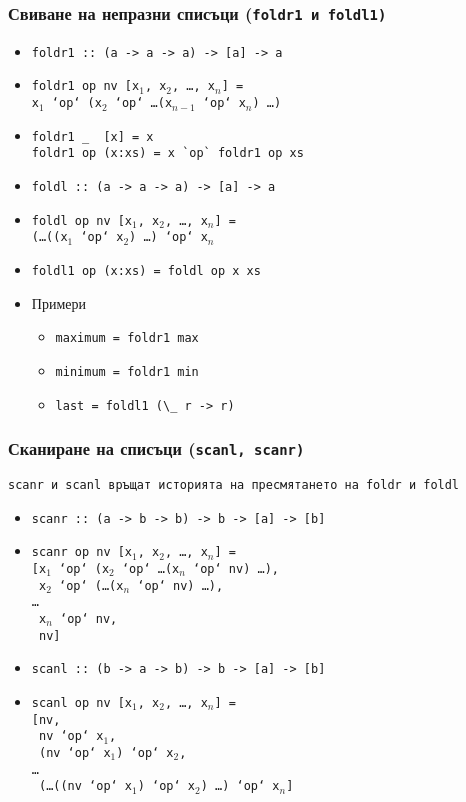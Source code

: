 \documentclass{beamer}
\begin{document}
\begin{frame}[fragile]
  \frametitle{Свиване на непразни списъци (\tt{foldr1} и \tt{foldl1})}
  \begin{itemize}[<+->]
  \item \tt{foldr1 :: (a -> a -> a) -> [a] -> a}
  \item \tt{foldr1 op nv [x$_1$, x$_2$, \ldots, x$_n$]} = \\
    \tt{x$_1$ `op` (x$_2$ `op` \ldots (x$_{n-1}$ `op` x$_n$) \ldots)}
  \item
\begin{verbatim}
foldr1 _  [x] = x
foldr1 op (x:xs) = x `op` foldr1 op xs
\end{verbatim}
  \item \tt{foldl :: (a -> a -> a) -> [a] -> a}
  \item \tt{foldl op nv [x$_1$, x$_2$, \ldots, x$_n$]} = \\
    \tt{(\ldots((x$_1$ `op` x$_2$) \ldots ) `op` x$_n$}
  \item \tt{foldl1 op (x:xs) = foldl op x xs}
  \item Примери
    \begin{itemize}
    \item \tt{maximum = foldr1 max}
    \item \tt{minimum = foldr1 min}
    \item \tt{last = foldl1 (\textbackslash \_ r -> r)}
    \end{itemize}
  \end{itemize}
\end{frame}

\begin{frame}
  \frametitle{Сканиране на списъци (\tt{scanl}, \tt{scanr})}
  \tt{scanr} и \tt{scanl} връщат историята на пресмятането на \tt{foldr} и \tt{foldl}
  \pause\small
  \begin{itemize}[<+->]
  \item \tt{scanr :: (a -> b -> b) -> b -> [a] -> \alert{[b]}}
  \item \tt{scanr op nv [x$_1$, x$_2$, \ldots, x$_n$]} = \\
    \tt{[x$_1$ `op` (x$_2$ `op` \ldots (x$_n$ `op` nv) \ldots),}\\
    \tt{ x$_2$ `op` (\ldots (x$_n$ `op` nv) \ldots),}\\
    \ldots\\
    \tt{ x$_n$ `op` nv,}\\
    \tt{ nv]}
  \item \tt{scanl :: (b -> a -> b) -> b -> [a] -> \alert{[b]}}
  \item \tt{scanl op nv [x$_1$, x$_2$, \ldots, x$_n$]} = \\
    \tt{[nv,}\\
    \tt{ nv `op` x$_1$,}\\
    \tt{ (nv `op` x$_1$) `op` x$_2$,}\\
    \ldots\\
    \tt{ (\ldots((nv `op` x$_1$) `op` x$_2$) \ldots ) `op` x$_n$]}
  \end{itemize}
\end{frame}
\end{document}
